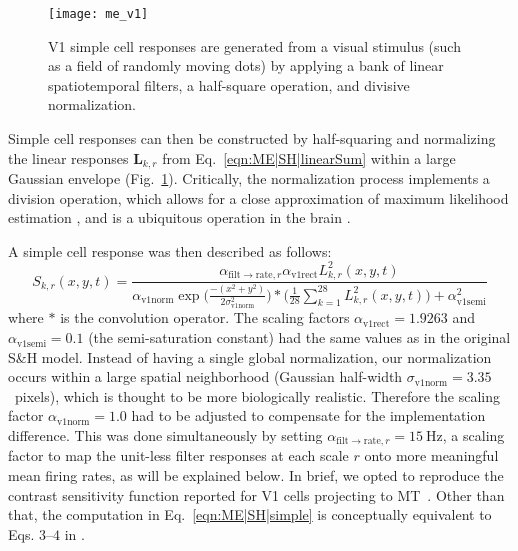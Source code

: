 \begin{figure}[t]
  \centering
  \texttt{[image: me\_v1]}
  \caption{
  \ac{V1} simple cell responses are generated from a visual stimulus
  (such as a field of randomly moving dots) by applying a bank of linear
  spatiotemporal filters, a half-square operation, and divisive normalization.}
  \label{fig:ME|SH|V1}
\end{figure}

Simple cell responses can then be constructed by half-squaring
and normalizing the linear responses $\mathbf{L}_{k,r}$ from
Eq.~\ref{eqn:ME|SH|linearSum} within a large Gaussian envelope
(Fig.~\ref{fig:ME|SH|V1}).
Critically, the normalization process implements a division operation,
which allows for a close approximation of maximum likelihood estimation
\citep{Deneve1999}, and is a ubiquitous operation in the brain
\citep{CarandiniHeeger2012}.

A simple cell response was then described as follows:
\begin{equation}
S_{k,r}(x,y,t) = 
	\frac{
    	\alpha_{\textrm{filt}\rightarrow\textrm{rate}, r}
        \alpha_{\textrm{v1rect}} L^2_{k,r}(x,y,t)
    }{
    	\alpha_{\textrm{v1norm}}
        \exp \Big( \frac{-(x^2+y^2)}{2\sigma_{\textrm{v1norm}}^2} \Big)
        * \Big( \frac{1}{28} \sum_{k=1}^{28} L^2_{k,r}(x,y,t) \Big)
        +\alpha_{\textrm{v1semi}}^2
    }
\label{eqn:ME|SH|simple}
\end{equation}
where $*$ is the convolution operator.
The scaling factors $\alpha_{\textrm{v1rect}}=1.9263$ and
$\alpha_{\textrm{v1semi}}=0.1$ (the semi-saturation constant) 
had the same values as in the original S\&H model.
Instead of having a single global
normalization, our normalization occurs within a large spatial
neighborhood (Gaussian half-width $\sigma_{\textrm{v1norm}}=3.35$~pixels),
which is thought to be more biologically realistic. Therefore
the scaling factor 
$\alpha_{\textrm{v1norm}}=1.0$
had to be adjusted to compensate for the implementation difference.
This was done simultaneously
by setting
$\alpha_{\textrm{filt}\rightarrow\textrm{rate}, r} = \SI{15}{\hertz}$,
a scaling factor to map the unit-less filter responses
at each scale $r$ onto more meaningful
mean firing rates, as will be explained below. In brief,
we opted to reproduce the contrast sensitivity function reported
for V1 cells projecting to MT~\citep{MovshonNewsome1996}.
Other than that, the computation in Eq.~\ref{eqn:ME|SH|simple}
is conceptually equivalent to Eqs. $3$--$4$ in \cite{SimoncelliHeeger1998}.



